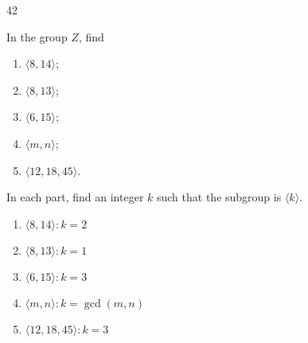 \begin{hwproblem}
{42}{
    In the group $Z$, find
    \begin{enumerate}[label=\alph*.]
        \item $\langle 8,14\rangle$;
        \item $\langle 8,13\rangle$;
        \item $\langle 6,15\rangle$;
        \item $\langle m, n\rangle$;
        \item $\langle 12,18,45\rangle$.
    \end{enumerate}
    In each part, find an integer $k$ such that the subgroup is $\langle k\rangle$.
}

\begin{enumerate}[label=\alph*.]
    \item $\langle 8,14\rangle: k=2$
    \item $\langle 8,13\rangle : k=1$
    \item $\langle 6,15\rangle : k=3$
    \item $\langle m, n\rangle : k=\gcd(m, n)$
    \item $\langle 12,18,45\rangle : k=3$
\end{enumerate}
\end{hwproblem}
